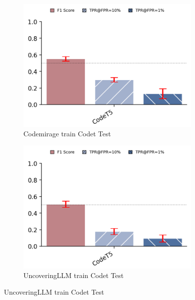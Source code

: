 \begin{figure}[H]
    \begin{subfigure}[b]{0.45\textwidth}
        \centering
        \includegraphics[width=\linewidth]{img/codemiragetrain1.png}
        \caption{Codemirage train Codet Test}
        \label{fig:ffesfe6}
    \end{subfigure}
    \hfill
    \begin{subfigure}[b]{0.4\textwidth}
        \centering
        \includegraphics[width=\linewidth]{img/uncoveringTrain.png}
        \caption{UncoveringLLM train Codet Test}
        \label{fig:bfseds6}
    \end{subfigure}
\end{figure}



